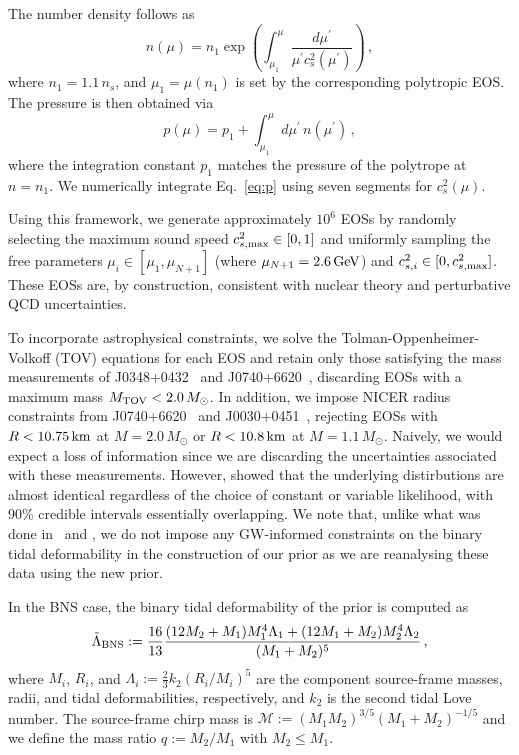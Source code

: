 \documentclass[twocolumn]{aastex631}
\begin{document}
The number density follows as 
%
\begin{equation} \label{eq:n}
 n(\mu) = n_1 \exp \left({\int_{\mu_1}^\mu \frac{d\mu^\prime}{\mu^\prime
     c_s^2(\mu^\prime)}}\right)\,,
\end{equation} 
%
where $n_1 = 1.1\,n_s$, and $\mu_1 = \mu(n_1)$ is set by the
corresponding polytropic EOS. The pressure is then obtained via
%
\begin{equation} \label{eq:p}
 p(\mu) = p_1 + \int_{\mu_1}^\mu d\mu^\prime \, n(\mu^\prime)\,,
\end{equation}
%
where the integration constant $p_1$ matches the pressure of the
polytrope at $n = n_1$. We numerically integrate Eq.~\eqref{eq:p} using
seven segments for $c_s^2(\mu)$.

Using this framework, we generate approximately $10^6$ EOSs by randomly
selecting the maximum sound speed $c_{s,{\rm max}}^2 \in [0,1]$ and
uniformly sampling the free parameters $\mu_i \in [\mu_1, \mu_{N+1}]$
(where $\mu_{N+1} = 2.6\,\rm GeV$) and $c_{s,i}^2 \in [0, c_{s,{\rm
      max}}^2]$. These EOSs are, by construction, consistent with
nuclear theory and perturbative QCD uncertainties.

To incorporate astrophysical constraints, we solve the
Tolman-Oppenheimer-Volkoff (TOV) equations for each EOS and retain only
those satisfying the mass measurements of J0348+0432~\citep[][$M =
  2.01\pm 0.04\,M_{\odot}$]{Antoniadis2013} and J0740+6620~\citep[][$M =
  2.08 \pm 0.07\,M_{\odot}$]{Cromartie2019, Fonseca2021}, discarding EOSs
with a maximum mass $M_{\rm TOV} < 2.0\,M_{\odot}$. In addition, we
impose NICER radius constraints from J0740+6620~\citep{Miller2021,
  Riley2021} and J0030+0451~\citep{Riley2019, MCMiller2019b}, rejecting
EOSs with $R < 10.75\,\rm km$ at $M = 2.0\,M_{\odot}$ or $R < 10.8\,\rm
km$ at $M = 1.1\,M_{\odot}$.
Naively, we would expect a loss of information since we are discarding the uncertainties associated with these measurements. 
However, \citet{2023Jiang} showed that the underlying distirbutions are almost identical regardless of the choice of constant or variable likelihood,
with 90\% credible intervals essentially overlapping. 
We note that, unlike what was done
in~\citet{Altiparmak:2022} and \citet{Ecker:2022dlg}, we do not impose any
GW-informed constraints on the binary tidal deformability in the
construction of our prior as we are reanalysing these data using the
new prior.
	
In the BNS case, the binary tidal deformability of the prior is computed
as
%
\begin{equation} 
 \tilde{\Lambda}_{\rm BNS} := \frac{16}{13} \frac{ (12M_2 + M_1) M_1^4
   \Lambda_1 + (12M_1 + M_2) M_2^4 \Lambda_2}{(M_1 + M_2)^5}\,,
\end{equation}
%
where $M_i$, $R_i$, and $\Lambda_i := \frac{2}{3} k_2 \left( R_i/M_i
\right)^5$ are the component source-frame masses, radii, and tidal
deformabilities, respectively, and $k_2$ is the second tidal Love
number. The source-frame chirp mass is $\mathcal{M} := (M_1
M_2)^{3/5} (M_1+M_2)^{-1/5}$ and we define the mass ratio $q := M_2/M_1$
with $M_2\le M_1$.
	
\end{document}
